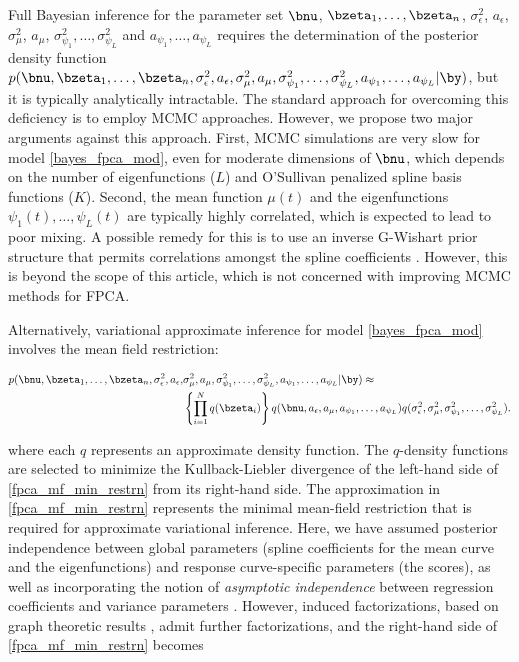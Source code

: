 \documentclass[ba]{imsart}
\numberwithin{equation}{section}
\theoremstyle{plain}
\def\sigsqeps{\sigma^2_{\epsilon}}
\def\aeps{a_{\epsilon}}
\def\sigsqmu{\sigma^2_{\mu}}
\def\amu{a_{\mu}}
\newcommand\sigsqpsi[1]{\sigma^2_{\psi_{#1}}}
\newcommand\apsi[1]{a_{\psi_{#1}}}
\begin{document}
Full Bayesian inference for the parameter set $\bnu$, $\bzeta_1, \dots, \bzeta_n$, $\sigsqeps$, $\aeps$,
$\sigsqmu$, $\amu$, $\sigsqpsi{1}, \dots, \sigsqpsi{L}$ and $\apsi{1}, \dots, \apsi{L}$ requires the determination
of the posterior density function $p (\bnu, \bzeta_1, \dots, \allowbreak
\bzeta_n, \sigsqeps, \aeps, \sigsqmu, \amu,
\sigsqpsi{1}, \dots, \sigsqpsi{L}, \apsi{1}, \dots, \apsi{L} | \by)$, but it is typically analytically intractable.
The standard approach for overcoming this deficiency is to
employ MCMC approaches. However, we propose two major arguments against this approach. First, MCMC
simulations are very slow for model \eqref{bayes_fpca_mod}, even for moderate dimensions of $\bnu$, which
depends on the number of eigenfunctions ($L$) and O'Sullivan penalized spline basis functions ($K$).
Second, the mean function $\mu (t)$ and the eigenfunctions $\psi_1 (t), \dots,
\psi_L (t)$ are typically highly correlated, which is expected to lead to poor mixing.
A possible remedy for this is to use an inverse G-Wishart prior structure that permits
correlations amongst the spline coefficients \citep{goldsmith16}. However, this is beyond the scope of this article,
which is not concerned with improving MCMC methods for FPCA.

Alternatively, variational approximate inference for model \eqref{bayes_fpca_mod} involves
the mean field restriction:

\begin{align}
\begin{split}
	p (
		\bnu, \bzeta_1, \dots, \bzeta_n, \sigsqeps, \aeps, &\sigsqmu, \amu,
		\sigsqpsi{1}, \dots, \sigsqpsi{L}, \apsi{1}, \dots, \apsi{L} | \by
	) \approx \\
		&\left\{ \prod_{i=1}^N q (\bzeta_i) \right\} q (\bnu, \aeps, \amu, \apsi{1}, \dots, \apsi{L})
		q(\sigsqeps, \sigsqmu, \sigsqpsi{1}, \dots, \sigsqpsi{L}).
\end{split}
\label{fpca_mf_min_restrn}
\end{align}

\noindent where each $q$ represents an approximate density function. The $q$-density functions are
selected to minimize the Kullback-Liebler divergence of the left-hand side of \eqref{fpca_mf_min_restrn}
from its right-hand side.
The approximation in \eqref{fpca_mf_min_restrn} represents the minimal mean-field restriction that is
required for approximate variational inference. Here, we have assumed posterior independence between
global parameters (spline coefficients for the mean curve and the eigenfunctions)
and response curve-specific parameters (the scores), as well as incorporating the notion of
\emph{asymptotic independence} between regression coefficients and variance parameters
\cite[Section~3.1]{menictas13}.
However, induced factorizations, based on graph theoretic
results \cite[Section~10.2.5]{bishop06}, admit further factorizations, and the right-hand side of
\eqref{fpca_mf_min_restrn} becomes
\end{document}
